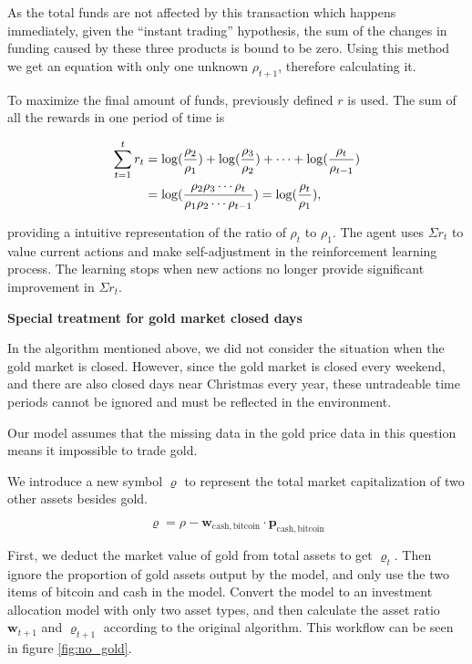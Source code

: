 \documentclass{mcmthesis}
\begin{document}
As the total funds are not affected by this transaction which happens immediately,
given the ``instant trading'' hypothesis,
the sum of the changes in funding caused by these three products is bound to be zero.
Using this method we get an equation with only one unknown $\rho _{t+1}$,
therefore calculating it.

To maximize the final amount of funds,
previously defined $r$ is used.
The sum of all the rewards in one period of time is


\begin{align}
  \sum_{t=1}^t r_t &= \log(\frac{\rho_2}{\rho_1}) + \log(\frac{\rho_3}{\rho_2}) + \cdots + \log(\frac{\rho_t}{\rho_{t-1}}) \notag \\
  &= \log(\frac{\rho_2 \rho_3 \cdots \rho_t}{\rho_1 \rho_2 \cdots \rho_{t-1}}) = \log(\frac{\rho_t}{\rho_1}),
\end{align}

providing a intuitive representation of the ratio of $\rho_t$ to $\rho_1$.
The agent uses $\Sigma r_t$ to value current actions and make self-adjustment
in the reinforcement learning process.
The learning stops when new actions no longer provide significant improvement in $\Sigma r_t$.

\noindent \textbf{Special treatment for gold market closed days} \par
In the algorithm mentioned above, we did not consider the situation when the gold market is closed. However, since the gold market is closed every weekend, and there are also closed days near Christmas every year, these untradeable time periods cannot be ignored and must be reflected in the environment. 

Our model assumes that the missing data in the gold price data in this question means it impossible to trade gold.

We introduce a new symbol $\varrho$ to represent the total market capitalization of two other assets besides gold.

\[
  \varrho = \rho - \pmb{w}_{\mathrm{cash, bitcoin}} \cdot \pmb{p}_{\mathrm{cash, bitcoin}}
\]


First, we deduct the market value of gold from total assets to get $\varrho_{t}$. Then ignore the proportion of gold assets output by the model, and only use the two items of bitcoin and cash in the model. Convert the model to an investment allocation model with only two asset types, and then calculate the asset ratio $\pmb{w}_{t+1}$ and $\varrho_{t+1}$ according to the original algorithm. This workflow can be seen in figure \ref{fig:no_gold}.
\end{document}
